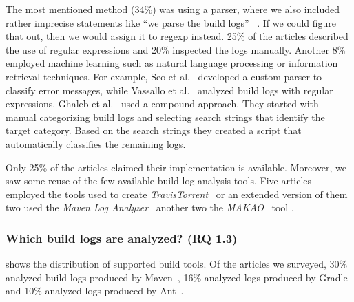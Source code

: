 The most mentioned method (34\%) was using a parser, where we also
included
rather imprecise statements like ``we parse the build logs''
~\cite{rahman2018impact}.
If we could figure that out, then we would assign it to regexp instead.
25\% of the articles described the use of regular expressions and 20\%
inspected the logs manually.
Another 8\% employed machine learning such as natural language
processing or information retrieval techniques.
For example,
Seo et al.~\cite{seo2014programmers} developed a custom
parser to classify error messages, while Vassallo et
al.~\cite{vassallo2017a-tale} analyzed build logs with regular
expressions.
Ghaleb et al.~\cite{ghaleb2019studying} used a compound approach.
They started with manual categorizing build logs and selecting
search strings that identify the target category.
Based on the search strings they created a script that automatically
classifies the remaining logs.

Only 25\% of the articles claimed their implementation is available.
Moreover, we
saw some reuse of the few available build log analysis tools.
Five articles employed the tools used to create
\emph{TravisTorrent}~\cite{beller2017travistorrent,beller2017oops,
orellana2017differences,zhao2018comparing} or
an extended version of them~\cite{rott2019empirische,
shi2018evaluating}
two used the
\emph{Maven Log Analyzer}~\cite{macho2018automatically,gallaba2018noise}
another two the
\emph{MAKAO}~\cite{wen2018blimp,adams2007design,adams2007makao} tool
.

\subsubsection{Which build logs are analyzed? (RQ 1.3)}
 shows the distribution of supported
build tools.
Of the articles we surveyed, 30\% analyzed build logs produced by
Maven~\cite{maven2019website}, 16\% analyzed logs produced by
Gradle~\cite{gradle2020website}
and 10\% analyzed logs produced by Ant~\cite{ant2020website}.

